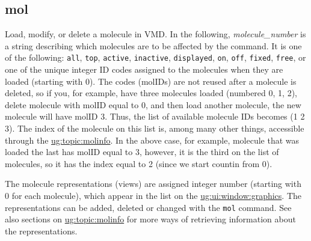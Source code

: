   \subsection{mol}
  \label{ug:ui:text:mol}
Load, modify, or delete a molecule in VMD.  In the following, {\it
molecule\_number} is a string describing which molecules are to be
affected by the command.  It is one of the following: {\tt all}, {\tt top}, 
{\tt active}, {\tt inactive}, {\tt displayed}, {\tt on}, {\tt off}, 
{\tt fixed}, {\tt free}, or one of the unique integer ID codes
assigned to the molecules when they are loaded (starting with 0). 
The codes (molIDs) are not reused after a molecule is deleted, so if you, 
for example, have three molecules loaded (numbered 0, 1, 2), 
delete molecule with molID equal to 0, and then load another molecule,
the new molecule will have molID 3. Thus, the list of available 
molecule IDs becomes (1 2 3). The index of
the molecule on this list is, among many other things,
accessible 
through the \hyperref{{\tt molinfo} command}{{\tt molinfo} command [\S}{]}
{ug:topic:molinfo}. In the above case, for example, molecule that 
was loaded the last has molID equal to 3, however, it is the third
on the list of molecules, so it has the index equal to 2 (since we
start countin from 0).

The molecule representations (views)
are assigned integer number (starting with 0 for each molecule), 
which appear in the list on 
the \hyperref{{\sf Graphics} window}{{\sf Graphics} window [\S }{]}{ug:ui:window:graphics}.
The representations can be added, deleted or changed with the {\tt mol}
command. See also sections on
\hyperref{{\tt molinfo} command}{{\tt molinfo} command [\S~ }{]}
{ug:topic:molinfo} for more ways of retrieving information about the 
representations. 

